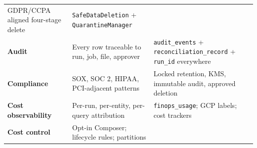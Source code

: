 \documentclass[
  11pt,
  british,
  oneside]{book}
\begin{document}
\begin{longtable}[]{@{}lll@{}}
\begin{minipage}[t]{0.30\columnwidth}
GDPR\index{GDPR}/CCPA aligned four-stage delete\strut
\end{minipage} & \begin{minipage}[t]{0.30\columnwidth}\raggedright
\texttt{SafeDataDeletion} + \texttt{QuarantineManager}\strut
\end{minipage}\tabularnewline
\begin{minipage}[t]{0.30\columnwidth}\raggedright
\textbf{Audit}\strut
\end{minipage} & \begin{minipage}[t]{0.30\columnwidth}\raggedright
Every row traceable to run, job, file, approver\strut
\end{minipage} & \begin{minipage}[t]{0.30\columnwidth}\raggedright
\texttt{audit\_events} + \texttt{reconciliation\_record} +
\texttt{run\_id} everywhere\strut
\end{minipage}\tabularnewline
\begin{minipage}[t]{0.30\columnwidth}\raggedright
\textbf{Compliance}\strut
\end{minipage} & \begin{minipage}[t]{0.30\columnwidth}\raggedright
SOX\index{SOX}, SOC 2\index{SOC 2}, HIPAA, PCI-adjacent patterns\strut
\end{minipage} & \begin{minipage}[t]{0.30\columnwidth}\raggedright
Locked retention, KMS, immutable audit, approved deletion\strut
\end{minipage}\tabularnewline
\begin{minipage}[t]{0.30\columnwidth}\raggedright
\textbf{Cost observability}\strut
\end{minipage} & \begin{minipage}[t]{0.30\columnwidth}\raggedright
Per-run, per-entity, per-query attribution\strut
\end{minipage} & \begin{minipage}[t]{0.30\columnwidth}\raggedright
\texttt{finops\_usage}; GCP labels; cost trackers\strut
\end{minipage}\tabularnewline
\begin{minipage}[t]{0.30\columnwidth}\raggedright
\textbf{Cost control}\strut
\end{minipage} & \begin{minipage}[t]{0.30\columnwidth}\raggedright
Opt-in Composer; lifecycle rules; partitions\strut
\end{minipage} & \begin{minipage}[t]{0.30\columnwidth}\raggedright

\end{minipage}
\end{longtable}
\end{document}
